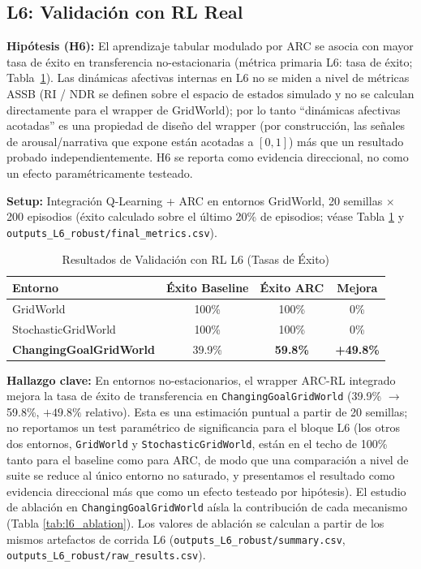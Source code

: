 \documentclass{article}
\begin{document}
\subsection{L6: Validación con RL Real}

\textbf{Hipótesis (H6):} El aprendizaje tabular modulado por ARC se asocia con mayor tasa de éxito en transferencia no-estacionaria (métrica primaria L6: tasa de éxito; Tabla~\ref{tab:l6_results}). Las dinámicas afectivas internas en L6 no se miden a nivel de métricas ASSB (RI / NDR se definen sobre el espacio de estados simulado y no se calculan directamente para el wrapper de GridWorld); por lo tanto ``dinámicas afectivas acotadas'' es una propiedad de diseño del wrapper (por construcción, las señales de arousal/narrativa que expone están acotadas a $[0,1]$) más que un resultado probado independientemente. H6 se reporta como evidencia direccional, no como un efecto paramétricamente testeado.

\textbf{Setup:} Integración Q-Learning + ARC en entornos GridWorld, 20 semillas $\times$ 200 episodios (éxito calculado sobre el último 20\% de episodios; véase Tabla \ref{tab:l6_results} y \texttt{outputs\_L6\_robust/final\_metrics.csv}).

\begin{table}[htbp]
\centering
\caption{Resultados de Validación con RL L6 (Tasas de Éxito)}
\label{tab:l6_results}
\begin{tabular}{@{}lccc@{}}
\toprule
Entorno & Éxito Baseline & Éxito ARC & Mejora \\ \midrule
GridWorld & 100\% & 100\% & 0\% \\
StochasticGridWorld & 100\% & 100\% & 0\% \\
\textbf{ChangingGoalGridWorld} & 39.9\% & \textbf{59.8\%} & \textbf{+49.8\%} \\ \bottomrule
\end{tabular}
\end{table}

\textbf{Hallazgo clave:} En entornos no-estacionarios, el wrapper ARC-RL integrado mejora la tasa de éxito de transferencia en \texttt{ChangingGoalGridWorld} (39.9\% $\rightarrow$ 59.8\%, $+49.8\%$ relativo). Esta es una estimación puntual a partir de 20 semillas; no reportamos un test paramétrico de significancia para el bloque L6 (los otros dos entornos, \texttt{GridWorld} y \texttt{StochasticGridWorld}, están en el techo de 100\% tanto para el baseline como para ARC, de modo que una comparación a nivel de suite se reduce al único entorno no saturado, y presentamos el resultado como evidencia direccional más que como un efecto testeado por hipótesis). El estudio de ablación en \texttt{ChangingGoalGridWorld} aísla la contribución de cada mecanismo (Tabla \ref{tab:l6_ablation}). Los valores de ablación se calculan a partir de los mismos artefactos de corrida L6 (\texttt{outputs\_L6\_robust/summary.csv}, \texttt{outputs\_L6\_robust/raw\_results.csv}).
\end{document}
